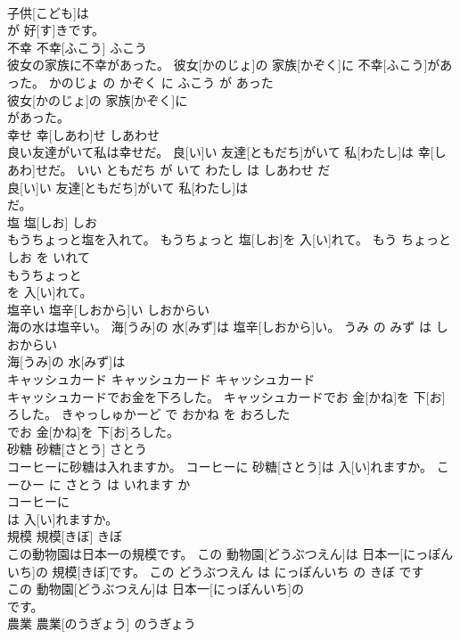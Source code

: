 \documentclass[8pt]{extreport}
\begin{document}
\begin{CJK}{UTF8}{min}
\\	子供[こども]は
\\	が 好[す]きです。			
\\	不幸	不幸[ふこう]	ふこう	
\\	彼女の家族に不幸があった。	彼女[かのじょ]の 家族[かぞく]に 不幸[ふこう]があった。	かのじょ の かぞく に ふこう が あった	
\\	彼女[かのじょ]の 家族[かぞく]に
\\	があった。			
\\	幸せ	幸[しあわ]せ	しあわせ	
\\	良い友達がいて私は幸せだ。	良[い]い 友達[ともだち]がいて 私[わたし]は 幸[しあわ]せだ。	いい ともだち が いて わたし は しあわせ だ	
\\	良[い]い 友達[ともだち]がいて 私[わたし]は
\\	だ。			
\\	塩	塩[しお]	しお	
\\	もうちょっと塩を入れて。	もうちょっと 塩[しお]を 入[い]れて。	もう ちょっと しお を いれて	
\\	もうちょっと
\\	を 入[い]れて。			
\\	塩辛い	塩辛[しおから]い	しおからい	
\\	海の水は塩辛い。	海[うみ]の 水[みず]は 塩辛[しおから]い。	うみ の みず は しおからい	
\\	海[うみ]の 水[みず]は
\\	キャッシュカード	キャッシュカード	キャッシュカード	
\\	キャッシュカードでお金を下ろした。	キャッシュカードでお 金[かね]を 下[お]ろした。	きゃっしゅかーど で おかね を おろした	
\\	でお 金[かね]を 下[お]ろした。			
\\	砂糖	砂糖[さとう]	さとう	
\\	コーヒーに砂糖は入れますか。	コーヒーに 砂糖[さとう]は 入[い]れますか。	こーひー に さとう は いれます か	
\\	コーヒーに
\\	は 入[い]れますか。			
\\	規模	規模[きぼ]	きぼ	
\\	この動物園は日本一の規模です。	この 動物園[どうぶつえん]は 日本一[にっぽんいち]の 規模[きぼ]です。	この どうぶつえん は にっぽんいち の きぼ です	
\\	この 動物園[どうぶつえん]は 日本一[にっぽんいち]の
\\	です。			
\\	農業	農業[のうぎょう]	のうぎょう	

\end{CJK}
\end{document}
